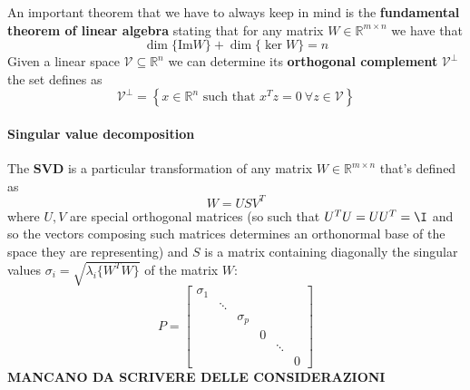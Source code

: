 	An important theorem that we have to always keep in mind is the \textbf{fundamental theorem of linear algebra} stating that for any matrix $W \in \mathds R^{m\times n}$ we have that
	\[ \dim\{ \textrm{Im} W \} + \dim\{\ker W \} = n \]
	Given a linear space $\mathcal V \subseteq \mathds R^n$ we can determine its \textbf{orthogonal complement} $\mathcal V^\perp$ the set defines as
	\[ \mathcal V^\perp = \left\{ x \in \mathds R^n \textrm{ such that } x^T z = 0 \ \forall z \in \mathcal V \right\} \]
	
	\paragraph{Singular value decomposition} The  \textbf{SVD} is a particular transformation of any matrix $W \in \mathds R^{m\times n}$ that's defined as
	\begin{equation}
		W = U S V^T
	\end{equation}
	where $U,V$ are special orthogonal matrices (so such that $U^TU = UU^T = \I$ and so the vectors composing such matrices determines an orthonormal base of the space they are representing) and $S$ is a matrix containing diagonally the singular values $\sigma_i = \sqrt{\lambda_i\{W^TW\}}$ of the matrix $W$:
	\[ P = \begin{bmatrix} \sigma_1 \\ & \ddots \\ & & \sigma_p \\ &&& 0 \\ &&&& \ddots \\ &&&&& 0 \end{bmatrix} \]
	\textbf{MANCANO DA SCRIVERE DELLE CONSIDERAZIONI}
	
